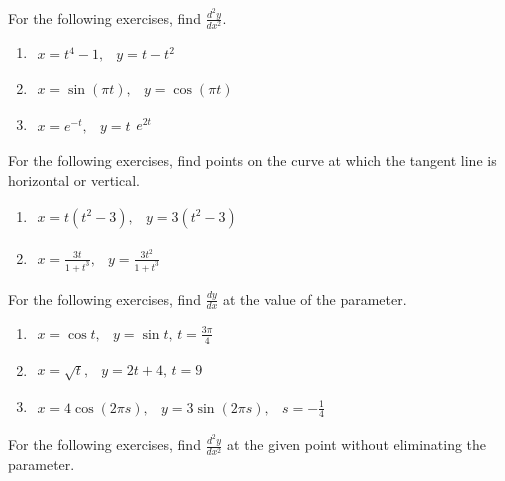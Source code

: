 \documentclass{exercises}
\begin{document}
For the following exercises, find $\frac{d^{2}y}{dx^{2}}$.

\begin{enumerate}[resume]
\item $\begin{matrix}x=t^{4}-1, & y=t-t^{2}\end{matrix}$
\item $\begin{matrix}x=\sin(\pi t), & y=\cos(\pi t)\end{matrix}$
\item $\begin{matrix}x=e^{-t}, & y=t\end{matrix}e^{2t}$
\end{enumerate}

For the following exercises, find points on the curve at which the tangent line is horizontal or vertical.

\begin{enumerate}[resume]
\item $\begin{matrix}x=t(t^{2}-3), & y=3(t^{2}-3)\end{matrix}$
\item $\begin{matrix}x=\frac{3t}{1+t^{3}}, & y=\frac{3t^{2}}{1+t^{3}}\end{matrix}$
\end{enumerate}

For the following exercises, find $\frac{dy}{dx}$ at the value of the parameter.

\begin{enumerate}[resume]
\item $\begin{matrix}x=\cos t, & y=\sin t,\,t=\frac{3\pi}{4}\end{matrix}$
\item $\begin{matrix}x=\sqrt{t}, & y=2t+4,\,t=9\end{matrix}$
\item $\begin{matrix}x=4\cos(2\pi s), & y=3\sin(2\pi s), & s=-\frac{1}{4}\end{matrix}$
\end{enumerate}

For the following exercises, find $\frac{d^{2}y}{dx^{2}}$ at the given point without eliminating the parameter.
\end{document}
